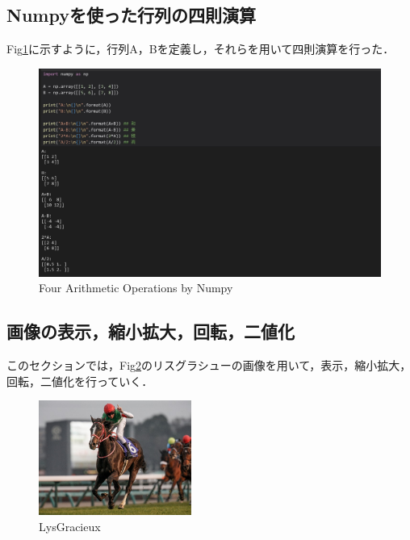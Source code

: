 \documentclass[11pt,a4j]{jarticle}
\begin{document}
\subsection{Numpyを使った行列の四則演算}
Fig\ref{output_1}に示すように，行列A，Bを定義し，それらを用いて四則演算を行った．
\begin{figure}[ht]
	\centering
	\includegraphics[width=\linewidth]{../1_BasicImageProcessing/output/output_1.jpg}
	\renewcommand{\figurename}{Fig}
	\caption{Four Arithmetic Operations by Numpy}
	\label{output_1}
\end{figure}

\subsection{画像の表示，縮小拡大，回転，二値化}
このセクションでは，Fig\ref{LysGracieux}のリスグラシューの画像を用いて，表示，縮小拡大，回転，二値化を行っていく．
\begin{figure}[ht]
	\centering
	\includegraphics[width=5cm]{../1_BasicImageProcessing/data/LysGracieux_Arima.jpg}
	\renewcommand{\figurename}{Fig}
	\caption{LysGracieux}
	\label{LysGracieux}
\end{figure}
\end{document}
